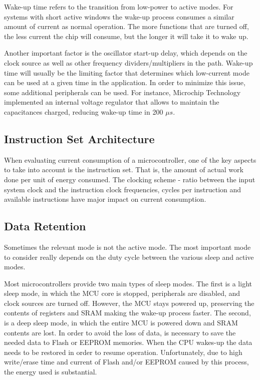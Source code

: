 \documentclass[11pt,a4paper]{report}
\begin{document}
Wake-up time refers to the transition from low-power to active modes. For systems with short active windows the wake-up process consumes a similar amount of current as normal operation. 
The more functions that are turned off, the less current the chip will consume, but the longer it will take it to wake up.

Another important factor is the oscillator start-up delay, which depends on the clock source as well as other frequency dividers/multipliers in the path.
Wake-up time will usually be the limiting factor that determines which low-current mode can be used at a given time in the application. 
In order to minimize this issue, some additional peripherals can be used. For instance, Microchip Technology implemented an internal voltage regulator that allows to maintain the capacitances charged, reducing wake-up time in 200 $\mu s$. 


\subsection{Instruction Set Architecture}


When evaluating current consumption of a microcontroller, one of the key aspects to take into account is the instruction set. That is, the amount of actual work done per unit of energy consumed. The clocking scheme - ratio between the input system clock and the instruction clock frequencies, cycles per instruction and available instructions have major impact on current consumption.

\subsection{Data Retention}

Sometimes the relevant mode is not the active mode. The most important mode to consider really depends on the duty cycle between the various sleep and active modes.

Most microcontrollers provide two main types of sleep modes. The first is a light sleep mode, in which the MCU core is stopped, peripherals are disabled, and clock sources are turned off. However, the MCU stays powered up, preserving the contents of registers and SRAM making the wake-up process faster.
The second, is a deep sleep mode, in which the entire MCU is powered down and SRAM contents are lost. In order to avoid the loss of data, is necessary to save the needed data to Flash or EEPROM memories. When the CPU wakes-up the data needs to be restored in order to resume operation. Unfortunately, due to high write/erase time and current of Flash and/or EEPROM caused by this process, the energy used is substantial. 
\end{document}
